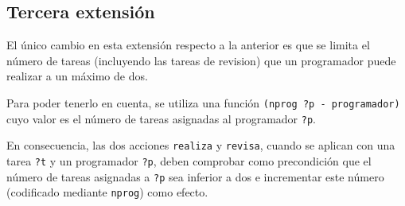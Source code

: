 
\subsection{Tercera extensión} \label{sec:mod-ext3}

El único cambio en esta extensión respecto a la anterior es que se limita el 
número de tareas (incluyendo las tareas de revision) que un programador puede 
realizar a un máximo de dos. 

Para poder tenerlo en cuenta, se utiliza una función 
\texttt{(nprog ?p - programador)} cuyo valor es el número de tareas asignadas 
al programador \texttt{?p}. 

En consecuencia, las dos acciones \texttt{realiza} y \texttt{revisa}, cuando 
se aplican con una tarea \texttt{?t} y un programador \texttt{?p}, deben 
comprobar como precondición que el número de tareas asignadas a \texttt{?p} 
sea inferior a dos e incrementar este número (codificado mediante 
\texttt{nprog}) como efecto.


